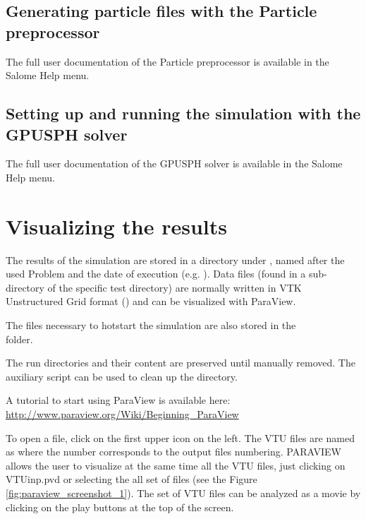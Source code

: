 \documentclass{../GPUSPHtemplate}
\begin{document}
\subsection{Generating particle files with the Particle preprocessor}\label{sec:preprocessing}

The full user documentation of the Particle preprocessor is available
in the Salome Help menu.

\subsection{Setting up and running the simulation with the GPUSPH solver}

The full user documentation of the GPUSPH solver is available
in the Salome Help menu.

\section{Visualizing the results}\label{sec:postprocess}

The results of the simulation are stored in a directory under
, named after the used Problem and the date of execution
(e.g. ). Data files (found in a
 sub-directory of the specific test directory) are normally
written in VTK Unstructured Grid format () and can be
visualized with ParaView.

The files necessary to hotstart the simulation are also stored
in the \\  folder.

The run directories and their content are preserved until manually
removed. The  auxiliary script can be used to clean
up the  directory.

A tutorial to start using ParaView is available here:
\url{http://www.paraview.org/Wiki/Beginning_ParaView}

To open a file, click on the first upper icon on the left. 
The VTU files are named as  where the number corresponds to
the output files numbering. 
PARAVIEW allows the user to visualize at the same time all the VTU files, 
just clicking on VTUinp.pvd or selecting the all set of  files
(see the Figure \ref{fig:paraview_screenshot_1}).
The set of VTU files can be analyzed as a movie by clicking on 
the play buttons at the top of the screen. 
\end{document}
